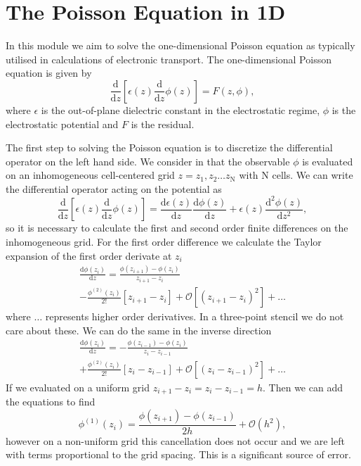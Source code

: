 \documentclass[reprint, amsmath,amssymb, aps]{revtex4-1}
\begin{document}
\section{The Poisson Equation in 1D}
In this module we aim to solve the one-dimensional Poisson equation as typically utilised in calculations of electronic transport. The one-dimensional Poisson equation is given by
\begin{equation}
    \frac{\mathrm{d}}{\mathrm{d} z} \left[\epsilon\left(z\right) \frac{\mathrm{d}}{\mathrm{d} z} \phi\left(z\right)\right] = F\left(z, \phi\right),
\end{equation}
where $\epsilon$ is the out-of-plane dielectric constant in the electrostatic regime, $\phi$ is the electrostatic potential and $F$ is the residual.

The first step to solving the Poisson equation is to discretize the differential operator on the left hand side. We consider in that the observable $\phi$ is evaluated on an inhomogeneous cell-centered grid $z = z_1, z_2 \dots z_{\mathrm{N}}$ with $\mathrm{N}$ cells. We can write the differential operator acting on the potential as
\begin{equation}
  \frac{\mathrm{d}}{\mathrm{d} z} \left[\epsilon\left(z\right) \frac{\mathrm{d}}{\mathrm{d} z} \phi\left(z\right)\right] = \frac{\mathrm{d} \epsilon\left(z\right)}{\mathrm{d} z} \frac{\mathrm{d} \phi\left(z\right)}{\mathrm{d} z} + \epsilon\left(z\right) \frac{\mathrm{d}^2 \phi\left(z\right)}{\mathrm{d} z^2},
\end{equation}
so it is necessary to calculate the first and second order finite differences on the inhomogeneous grid. For the first order difference we calculate the Taylor expansion of the first order derivate at $z_i$
\begin{multline}
  \frac{\mathrm{d} \phi\left(z_i\right)}{\mathrm{d} z} = \frac{\phi\left(z_{i + 1}\right) - \phi\left(z_{i}\right)}{z_{i+1} - z_i}  \\ -\frac{\phi^{(2)}\left(z_i\right)}{2!} \left[z_{i+1} - z_i\right] + \mathcal{O} \left[\left(z_{i+1} - z_i \right)^2\right] + \dots
\end{multline}
where $\dots$ represents higher order derivatives. In a three-point stencil we do not care about these. We can do the same in the inverse direction
\begin{multline}
  \frac{\mathrm{d} \phi\left(z_i\right)}{\mathrm{d} z} = - \frac{\phi\left(z_{i - 1}\right) - \phi\left(z_{i}\right)}{z_{i} - z_{i-1}} \\ + \frac{\phi^{(2)}\left(z_i\right)}{2!} \left[z_{i} - z_{i-1}\right] + \mathcal{O}\left[\left(z_{i} - z_{i-1}\right)^2\right] +\dots
\end{multline}
If we evaluated on a uniform grid $z_{i+1} - z_{i} = z_{i} - z_{i-1} = h$. Then we can add the equations to find
\begin{equation}
  \phi^{(1)}\left(z_i\right) = \frac{\phi\left(z_{i + 1}\right) - \phi\left(z_{i-1}\right)}{2 h} + \mathcal{O}\left(h^2\right),
\end{equation}
however on a non-uniform grid this cancellation does not occur and we are left with terms proportional to the grid spacing. This is a significant source of error.
\end{document}

